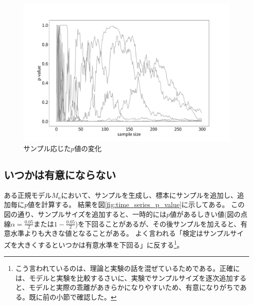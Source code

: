 \begin{figure}
 \begin{center}
  \includegraphics[width=15cm]{./image/04_/p_sample_size.pdf}
  \caption{サンプル応じた$p$値の変化}
  \label{fig:time_series_p_value_depends_sample_size}
 \end{center}
\end{figure}



\subsection{いつかは有意にならない}
ある正規モデル$M_a$において、サンプルを生成し、標本にサンプルを追加し、追加毎に$p$値を計算する。
結果を図\ref{fig:time_series_p_value}に示してある。
この図の通り、サンプルサイズを追加すると、一時的には$p$値があるしきい値(図の点線$\alpha=\frac{0.05}{2}$または$1-\frac{0.05}{2}$)を下回ることがあるが、その後サンプルを加えると、有意水準よりも大きな値となることがある。
よく言われる「検定はサンプルサイズを大きくするといつかは有意水準を下回る」に反する\footnote{こう言われているのは、理論と実験の話を混ぜているためである。正確には、モデルと実験を比較するさいに、実験でサンプルサイズを逐次追加すると、モデルと実際の乖離があきらかになりやすいため、有意になりがちである。既に前の小節で確認した。}。

